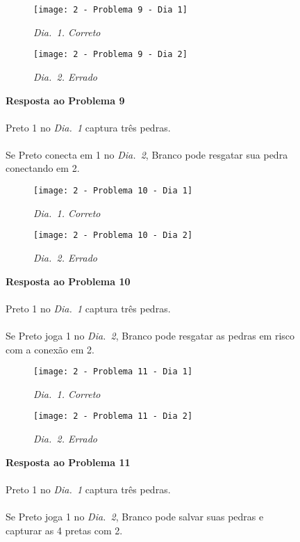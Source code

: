\vfill

\begin{SCfigure}[][h!]
    \begin{subfigure}[t]{.31\textwidth}
        \texttt{[image: 2 - Problema 9 - Dia 1]}
        \caption*{\emph{Dia.\@~1. Correto}}
    \end{subfigure}
    \hfill
    \begin{subfigure}[t]{.31\textwidth}
        \texttt{[image: 2 - Problema 9 - Dia 2]}
        \caption*{\emph{Dia.\@~2. Errado}}
    \end{subfigure}
    \hfill
    \caption*{\textbf{Resposta ao Problema 9}\\\\Preto 1 no \emph{Dia.\@~1} captura três pedras.\\\\
    Se Preto conecta em 1 no \emph{Dia.\@~2}, Branco pode resgatar sua pedra conectando em 2.}
\end{SCfigure}

\pagebreak

\begin{SCfigure}[][h!]
    \begin{subfigure}[t]{.31\textwidth}
        \texttt{[image: 2 - Problema 10 - Dia 1]}
        \caption*{\emph{Dia.\@~1. Correto}}
    \end{subfigure}
    \hfill
    \begin{subfigure}[t]{.31\textwidth}
        \texttt{[image: 2 - Problema 10 - Dia 2]}
        \caption*{\emph{Dia.\@~2. Errado}}
    \end{subfigure}
    \hfill
    \caption*{\textbf{Resposta ao Problema 10}\\\\Preto 1 no \emph{Dia.\@~1} captura três pedras.\\\\Se Preto joga 1 no \emph{Dia.\@~2}, Branco pode resgatar as pedras em risco com a conexão em 2.}
\end{SCfigure}

\vfill

\begin{SCfigure}[][h!]
    \begin{subfigure}[t]{.31\textwidth}
        \texttt{[image: 2 - Problema 11 - Dia 1]}
        \caption*{\emph{Dia.\@~1. Correto}}
    \end{subfigure}
    \hfill
    \begin{subfigure}[t]{.31\textwidth}
        \texttt{[image: 2 - Problema 11 - Dia 2]}
        \caption*{\emph{Dia.\@~2. Errado}}
    \end{subfigure}
    \hfill
    \caption*{\textbf{Resposta ao Problema 11}\\\\Preto 1 no \emph{Dia.\@~1} captura três pedras.\\\\Se Preto joga 1 no \emph{Dia.\@~2}, Branco pode salvar suas pedras e capturar as 4 pretas com 2.}
\end{SCfigure}

